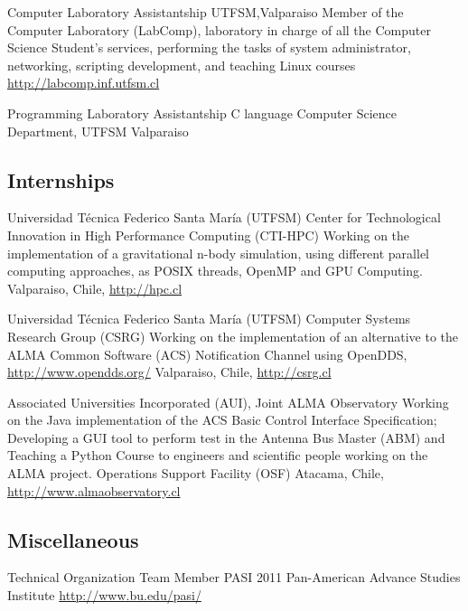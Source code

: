 \documentclass[11pt,a4paper]{moderncv}
\begin{document}
        {Computer Laboratory Assistantship}
        {UTFSM,Valparaiso}
        {Member of the Computer Laboratory (LabComp), laboratory in charge of all the Computer Science Student's services, performing the tasks of system administrator, networking, scripting development, and teaching Linux courses}
        {\url{http://labcomp.inf.utfsm.cl}}{}

        {Programming Laboratory Assistantship}
        {C language}
        {Computer Science Department, UTFSM}
        {Valparaiso}
        {}

\subsection{Internships}

        {Universidad Técnica Federico Santa María (UTFSM)}
        {Center for Technological Innovation in High Performance Computing (CTI-HPC)}
        {Working on the implementation of a gravitational n-body simulation, using different parallel computing approaches, as POSIX threads, OpenMP and GPU Computing.}
        {Valparaiso, Chile, \url{http://hpc.cl}}

        {Universidad Técnica Federico Santa María (UTFSM)}
        {Computer Systems Research Group (CSRG)}
        {Working on the implementation of an alternative to the ALMA Common Software (ACS) Notification Channel using OpenDDS, \url{http://www.opendds.org/}}
        {Valparaiso, Chile, \url{http://csrg.cl}}

        {Associated Universities Incorporated (AUI), Joint ALMA Observatory}
        {Working on the Java implementation of the ACS Basic Control Interface Specification; Developing a GUI tool to perform test in the Antenna Bus Master (ABM) and Teaching a Python Course to engineers and scientific people working on the ALMA project.}
        {Operations Support Facility (OSF)}
        {Atacama, Chile, \url{http://www.almaobservatory.cl}}


\subsection{Miscellaneous}

        {Technical Organization Team Member}
        {PASI 2011}
        {Pan-American Advance Studies Institute}
        {\url{http://www.bu.edu/pasi/}}
        {}
\end{document}
